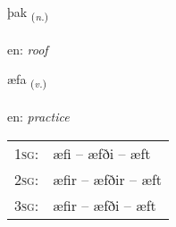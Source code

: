 \documentclass[frontgrid, backgrid]{flacards}\usepackage[]{graphicx}\usepackage[]{color}
\begin{document}
{þak \small{\textsubscript{(\textit{n.})}} \\[1ex] %
\textphonetic{[θaːk]} \\
en: \emph{roof} \\  [2ex]
\renewcommand*{\arraystretch}{0.8}
}

\renewcommand{\flhead}{\vskip5pt \fboxsep=0pt {\small\bfseries\footnotesize Sagnorð | Verb}}
\renewcommand{\fcfoot}{\vskip5pt \fboxsep=0pt \hspace{2pt}{\small\bfseries\footnotesize 2K}}

\renewcommand{\blhead}{\vskip5pt {\small\bfseries\footnotesize Sagnorð | Verb }}
\renewcommand{\bcfoot}{\vskip5pt \hspace{2pt}{\small\bfseries\footnotesize 2K}}


{æfa \small{\textsubscript{(\textit{v.})}} \\[1ex] %
\textphonetic{[aiːva]} \\
en: \emph{practice} \\  [2ex]
\renewcommand*{\arraystretch}{0.8}
\begin{tabular}{p{1cm}l}
\textsc{1sg}: & æfi -- æfði -- æft \\ 
\textsc{2sg}: & æfir -- æfðir -- æft \\ 
\textsc{3sg}: & æfir -- æfði -- æft \\ 
\end{tabular}
}

\renewcommand{\flhead}{\vskip5pt \fboxsep=0pt {\small\bfseries\footnotesize Nafnorð | Noun}}
\renewcommand{\fcfoot}{\vskip5pt \fboxsep=0pt \hspace{2pt}{\small\bfseries\footnotesize 2K}}

\renewcommand{\blhead}{\vskip5pt {\small\bfseries\footnotesize Nafnorð | Noun }}
\renewcommand{\bcfoot}{\vskip5pt \hspace{2pt}{\small\bfseries\footnotesize 2K}}
\end{document}
